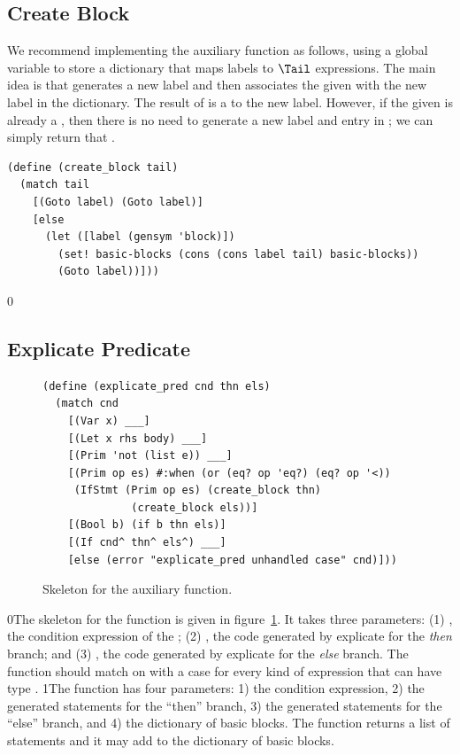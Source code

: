 \documentclass[7x10]{TimesAPriori_MIT}%
\def\racketEd{0}
\def\pythonEd{1}
\def\edition{0}
\newcommand{\racket}[1]{{\if\edition\racketEd{#1}\fi}}
\newcommand{\python}[1]{{\if\edition\pythonEd #1\fi}}
\numberwithin{theorem}{chapter}
\numberwithin{definition}{chapter}
\numberwithin{equation}{chapter}
\begin{document}
{\subsection{Create Block}

We recommend implementing the  auxiliary function
as follows, using a global variable  to store a
dictionary that maps labels to $\Tail$ expressions. The main idea is
that  generates a new label and then associates
the given  with the new label in the 
dictionary. The result of  is a  to the
new label. However, if the given  is already a ,
then there is no need to generate a new label and entry in
; we can simply return that .
%
\begin{lstlisting}
(define (create_block tail)
  (match tail
    [(Goto label) (Goto label)]
    [else
      (let ([label (gensym 'block)])
        (set! basic-blocks (cons (cons label tail) basic-blocks))
        (Goto label))]))
\end{lstlisting}


\fi}

{\if\edition\racketEd

\subsection{Explicate Predicate}
  
\begin{figure}[tbp]
  \begin{tcolorbox}[colback=white]
    \begin{lstlisting}
(define (explicate_pred cnd thn els)
  (match cnd
    [(Var x) ___]
    [(Let x rhs body) ___]
    [(Prim 'not (list e)) ___]
    [(Prim op es) #:when (or (eq? op 'eq?) (eq? op '<))
     (IfStmt (Prim op es) (create_block thn)
              (create_block els))]
    [(Bool b) (if b thn els)]
    [(If cnd^ thn^ els^) ___]
    [else (error "explicate_pred unhandled case" cnd)]))
\end{lstlisting}
  \end{tcolorbox}

  \caption{Skeleton for the  auxiliary function.}
\label{fig:explicate-pred}
\end{figure}
\fi}

\racket{The skeleton for the  function is given
  in figure~\ref{fig:explicate-pred}.  It takes three parameters:
  (1) \code{cnd}, the condition expression of the \code{if};
  (2) \code{thn}, the code generated by explicate for the \emph{then} branch;
  and (3) \code{els}, the code generated by
  explicate for the \emph{else} branch.  The \code{explicate\_pred}
  function should match on \code{cnd} with a case for
  every kind of expression that can have type \BOOLTY{}.}
%
\python{The  function has four parameters: 1)
  the condition expression, 2) the generated statements for the
  ``then'' branch, 3) the generated statements for the ``else''
  branch, and 4) the dictionary of basic blocks. The
  \code{explicate\_pred} function returns a list of \LangCIf{}
  statements and it may add to the dictionary of basic blocks.}
\end{document}
